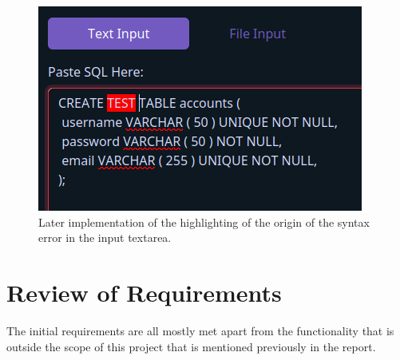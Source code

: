 \begin{figure}[h!]
	\centering
	\includegraphics[scale = 1]{highlightedTextArea}
	\caption{Later implementation of the highlighting of the origin of the syntax error in the input textarea.}
	\label{fig:highlightedTextArea}
\end{figure}

\newpage

\section{Review of Requirements}

The initial requirements are all mostly met apart from the functionality that is outside the scope of this project that is mentioned previously in the report. 

